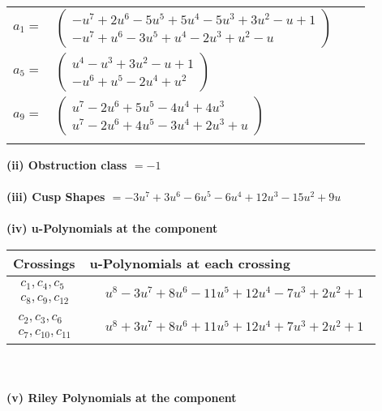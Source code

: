 \documentclass[1p]{elsarticle_modified}
\theoremstyle{definition}
\begin{document}
\begin{tabular}{m{7pt} m{180pt} m{7pt} m{180pt} }
\flushright $a_{1}=$&$\begin{pmatrix}- u^7+2 u^6-5 u^5+5 u^4-5 u^3+3 u^2- u+1\\- u^7+u^6-3 u^5+u^4-2 u^3+u^2- u\end{pmatrix}$ \\
\flushright $a_{5}=$&$\begin{pmatrix}u^4- u^3+3 u^2- u+1\\- u^6+u^5-2 u^4+u^2\end{pmatrix}$ \\
\flushright $a_{9}=$&$\begin{pmatrix}u^7-2 u^6+5 u^5-4 u^4+4 u^3\\u^7-2 u^6+4 u^5-3 u^4+2 u^3+u\end{pmatrix}$\\&\end{tabular}
\flushleft \textbf{(ii) Obstruction class $= -1$}\\~\\
\flushleft \textbf{(iii) Cusp Shapes $= -3 u^7+3 u^6-6 u^5-6 u^4+12 u^3-15 u^2+9 u$}\\~\\
\newpage\renewcommand{\arraystretch}{1}
\flushleft \textbf{(iv) u-Polynomials at the component}\newline \\
\begin{tabular}{m{50pt}|m{274pt}}
Crossings & \hspace{64pt}u-Polynomials at each crossing \\
\hline $$\begin{aligned}c_{1},c_{4},c_{5}\\c_{8},c_{9},c_{12}\end{aligned}$$&$\begin{aligned}
&u^8-3 u^7+8 u^6-11 u^5+12 u^4-7 u^3+2 u^2+1
\end{aligned}$\\
\hline $$\begin{aligned}c_{2},c_{3},c_{6}\\c_{7},c_{10},c_{11}\end{aligned}$$&$\begin{aligned}
&u^8+3 u^7+8 u^6+11 u^5+12 u^4+7 u^3+2 u^2+1
\end{aligned}$\\
\hline
\end{tabular}\\~\\
\newpage\renewcommand{\arraystretch}{1}
\flushleft \textbf{(v) Riley Polynomials at the component}\newline \\
\end{document}
